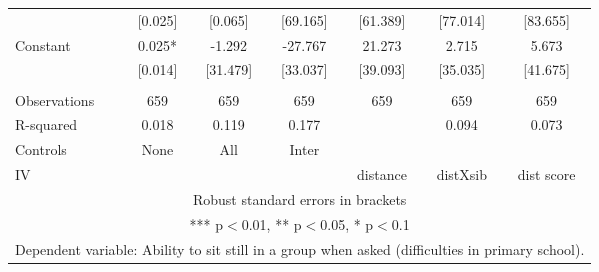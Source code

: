 \begin{tabular}{lcccccc}
 & [0.025] & [0.065] & [69.165] & [61.389] & [77.014] & [83.655] \\
Constant & 0.025* & -1.292 & -27.767 & 21.273 & 2.715 & 5.673 \\
 & [0.014] & [31.479] & [33.037] & [39.093] & [35.035] & [41.675] \\
 &  &  &  &  &  &  \\
Observations & 659 & 659 & 659 & 659 & 659 & 659 \\
R-squared & 0.018 & 0.119 & 0.177 &  & 0.094 & 0.073 \\
Controls & None & All & Inter &  &  &  \\
 IV &  &  &  & distance & distXsib & dist score \\ \hline
\multicolumn{7}{c}{ Robust standard errors in brackets} \\
\multicolumn{7}{c}{ *** p$<$0.01, ** p$<$0.05, * p$<$0.1} \\
\multicolumn{7}{c}{ Dependent variable: Ability to sit still in a group when asked (difficulties in primary school).} \\
\end{tabular}
